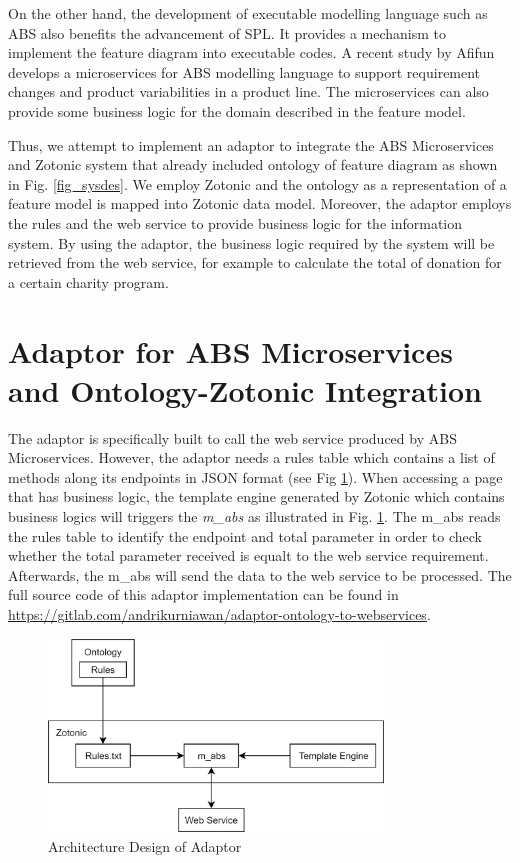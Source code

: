 \documentclass[conference]{IEEEtran}
\begin{document}
On the other hand, the development of executable modelling language such as ABS \cite{ABS} also benefits the advancement of SPL. It provides a mechanism to implement the feature diagram into executable codes. A recent study by Afifun \cite{absmc} develops a microservices for ABS modelling language to support requirement changes and product variabilities in a product line. The microservices can also provide some business logic for the domain described in the feature model.

Thus, we attempt to implement an adaptor to integrate the ABS Microservices and Zotonic system that already included ontology of feature diagram as shown in Fig. \ref{fig_sysdes}. We employ Zotonic and the ontology as a representation of a feature model is mapped into Zotonic data model. Moreover, the adaptor employs the rules and the web service to provide business logic for the information system. By using the adaptor, the business logic required by the system will be retrieved from the web service, for example to calculate the total of donation for a certain charity program.

\section{Adaptor for ABS Microservices and Ontology-Zotonic Integration} \label{adaptor}
The adaptor is specifically built to call the web service produced by ABS Microservices. However, the adaptor needs a rules table which contains a list of methods along its endpoints in JSON format (see Fig \ref{fig_design}). When accessing a page that has business logic, the template engine generated by Zotonic which contains business logics will triggers the \textit{m\_abs} as illustrated in Fig. \ref{fig_design}. The m\_abs reads the rules table to identify the endpoint and total parameter in order to check whether the total parameter received is equalt to the web service requirement. Afterwards, the m\_abs will send the data to the web service to be processed. The full source code of this adaptor implementation can be found in \url{https://gitlab.com/andrikurniawan/adaptor-ontology-to-webservices}.

\begin{figure}[h]
\centering
\includegraphics[width=3.5in]{adaptordesign}

\caption{Architecture Design of Adaptor}
\label{fig_design}
\end{figure}
\end{document}
